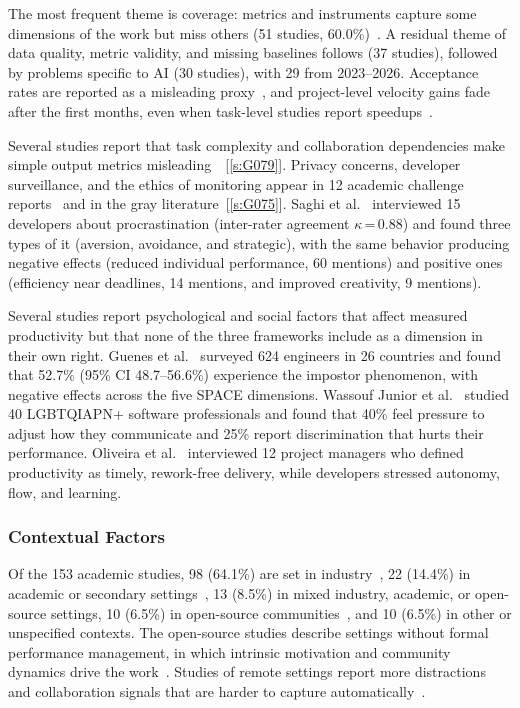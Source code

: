 \documentclass[preprint,number]{elsarticle}
\newcommand{\refG}[1]{\ref{s:#1}}
\begin{document}
The most frequent theme is coverage: metrics and instruments capture some dimensions of the work but miss others (51 studies, 60.0\%)~\cite{P0021, P1280, P0244, P2078}. A residual theme of data quality, metric validity, and missing baselines follows (37 studies), followed by problems specific to AI (30 studies), with 29 from 2023--2026. Acceptance rates are reported as a misleading proxy~\cite{P2028, P2100}, and project-level velocity gains fade after the first months, even when task-level studies report speedups~\cite{P2032}. 

Several studies report that task complexity and collaboration dependencies make simple output metrics misleading~\cite{P0061, P1259, P2106, P2116}~[\refG{G079}]. Privacy concerns, developer surveillance, and the ethics of monitoring appear in 12 academic challenge reports~\cite{P1259, P2101, P2125} and in the gray literature~[\refG{G075}].
Saghi et al.~\cite{P0181} interviewed 15 developers about procrastination (inter-rater agreement $\kappa$\,=\,0.88) and found three types of it (aversion, avoidance, and strategic), with the same behavior producing negative effects (reduced individual performance, 60 mentions) and positive ones (efficiency near deadlines, 14 mentions, and improved creativity, 9 mentions).

Several studies report psychological and social factors that affect measured productivity but that none of the three frameworks include as a dimension in their own right. Guenes et al.~\cite{P0112} surveyed 624 engineers in 26 countries and found that 52.7\% (95\% CI 48.7--56.6\%) experience the impostor phenomenon, with negative effects across the five SPACE dimensions. Wassouf Junior et al.~\cite{P0473} studied 40 LGBTQIAPN+ software professionals and found that 40\% feel pressure to adjust how they communicate and 25\% report discrimination that hurts their performance.
Oliveira et al.~\cite{P1297} interviewed 12 project managers who defined productivity as timely, rework-free delivery, while developers stressed autonomy, flow, and learning.

\subsubsection{Contextual Factors}

Of the 153 academic studies, 98 (64.1\%) are set in industry~\cite{P0017, P0061, P0271, P0556}, 22 (14.4\%) in academic or secondary settings~\cite{P1286}, 13 (8.5\%) in mixed industry, academic, or open-source settings, 10 (6.5\%) in open-source communities~\cite{P0162, P0481, P0028}, and 10 (6.5\%) in other or unspecified contexts.
The open-source studies describe settings without formal performance management, in which intrinsic motivation and community dynamics drive the work~\cite{P0162, P0028}. Studies of remote settings report more distractions and collaboration signals that are harder to capture automatically~\cite{P1503, P0611}.
\end{document}
